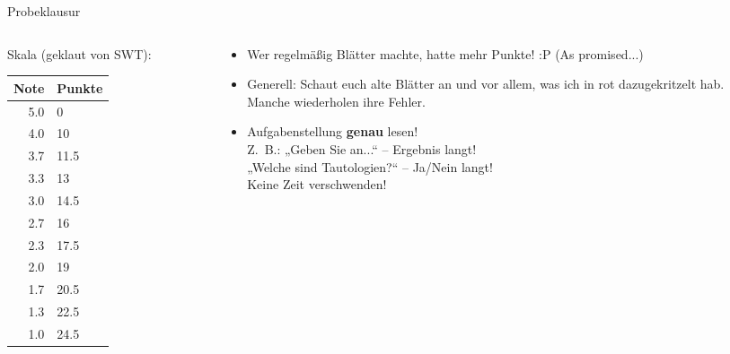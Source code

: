 




\graphicspath{{../figures/}}

\morescalingdelimiters




\begin{frame}{Probeklausur}
	\begin{columns}[T] 
		\hspace{.5\baselineskip}
		\begin{column}[T]{.30\textwidth} 
			Skala {\small (geklaut von SWT)}: \\
			\begin{tabular}{|r|l|}
				\hline
				Note & Punkte \\
				\hline
				5.0	& 0 	\\ \hline
				4.0 & 10	\\ \hline
				3.7 & 11.5	\\ \hline
				3.3	& 13	\\ \hline
				3.0	& 14.5	\\ \hline
				2.7	& 16	\\ \hline
				2.3	& 17.5	\\ \hline
				2.0	& 19	\\ \hline
				1.7	& 20.5	\\ \hline
				1.3	& 22.5	\\ \hline
				1.0	& 24.5	\\ \hline
			\end{tabular}
		\end{column}
		\hspace{-\baselineskip}
		\begin{column}[T]{.68\textwidth} 
			\begin{itemize}
				\item Wer regelmäßig Blätter machte, hatte mehr Punkte! :P {\small (As promised...)}
				\item Generell: Schaut euch alte Blätter an und vor allem, \alert{was ich in rot dazugekritzelt} hab. \\
				\impl Manche wiederholen ihre Fehler.
				\item Aufgabenstellung \textbf{genau} lesen! \\
				Z.~B.: „Geben Sie an...“ – Ergebnis langt! \\ „Welche sind Tautologien?“ – Ja/Nein langt! \\ \impl Keine Zeit verschwenden! 
				

\end{itemize}
\end{column}
\end{columns}
\end{frame}
